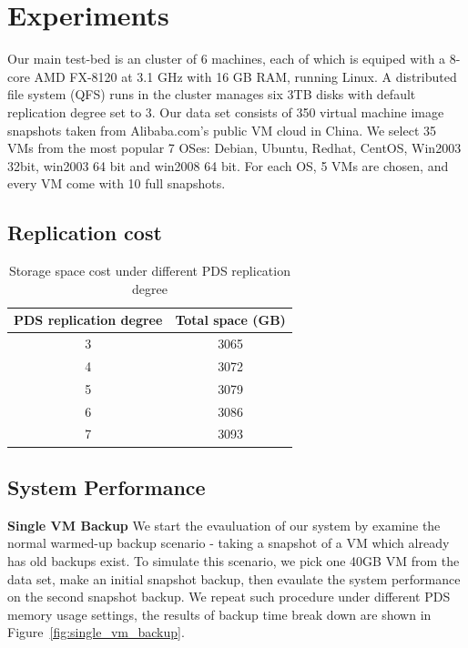 \section{Experiments}
Our main test-bed is an cluster of 6 machines,
each of which is equiped with a 8-core AMD FX-8120 at 3.1 GHz
with 16 GB RAM, running Linux.
A distributed file system (QFS) runs in the cluster manages six 3TB disks
 with default replication degree set to 3.
Our data set consists of 350 virtual machine image snapshots taken from Alibaba.com's
public VM cloud in China. We select 35 VMs from the most popular 7 OSes: 
Debian, Ubuntu, Redhat, CentOS, Win2003 32bit, win2003 64 bit and win2008 64 bit. 
For each OS, 5 VMs are chosen, and every VM come with 10 full snapshots.

\subsection{Replication cost}
\begin{table}
    \begin{tabular}{|c|c|}
    \hline
    PDS replication degree & Total space (GB) \\ \hline
    3                      & 3065             \\ \hline
    4                      & 3072             \\ \hline
    5                      & 3079             \\ \hline
    6                      & 3086             \\ \hline
    7                      & 3093             \\ \hline
    \end{tabular}
\caption{Storage space cost under different PDS replication degree}
\label{tab:replcation_cost}
\end{table}

\subsection{System Performance}
{\bf Single VM Backup} We start the evauluation of our system by examine the normal warmed-up
backup scenario - taking a snapshot of a VM which already has old backups exist. To simulate this
scenario, we pick one 40GB VM from the data set, make an initial snapshot backup, then
evaulate the system performance on the second snapshot backup. We repeat such procedure
under different PDS memory usage settings, the results of backup time break down are shown in
Figure~\ref{fig:single_vm_backup}. 

